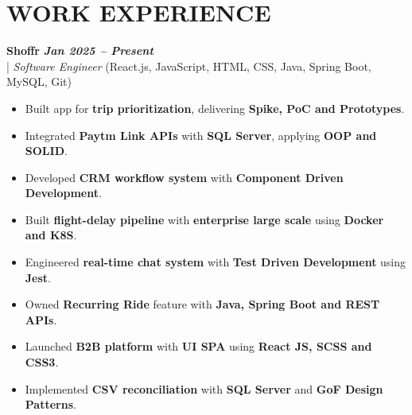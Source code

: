 \documentclass[10pt,a4paper]{article}
\begin{document}
\section*{WORK EXPERIENCE}
\small

\noindent
  \textbf{Shoffr} \hfill \textit{\textbf{Jan 2025 -- Present}} \\
  \;|\;
  \textit{Software Engineer} (React.js, JavaScript, HTML, CSS, Java, Spring Boot, MySQL, Git)
\begin{itemize}



\item Built app for \textbf{trip prioritization}, delivering \textbf{Spike, PoC and Prototypes}.



\item Integrated \textbf{Paytm Link APIs} with \textbf{SQL Server}, applying \textbf{OOP and SOLID}.



\item Developed \textbf{CRM workflow system} with \textbf{Component Driven Development}.



\item Built \textbf{flight-delay pipeline} with \textbf{enterprise large scale} using \textbf{Docker and K8S}.



\item Engineered \textbf{real-time chat system} with \textbf{Test Driven Development} using \textbf{Jest}.



\item Owned \textbf{Recurring Ride} feature with \textbf{Java, Spring Boot and REST APIs}.



\item Launched \textbf{B2B platform} with \textbf{UI SPA} using \textbf{React JS, SCSS and CSS3}.



\item Implemented \textbf{CSV reconciliation} with \textbf{SQL Server} and \textbf{GoF Design Patterns}.



\end{itemize}
\end{document}
